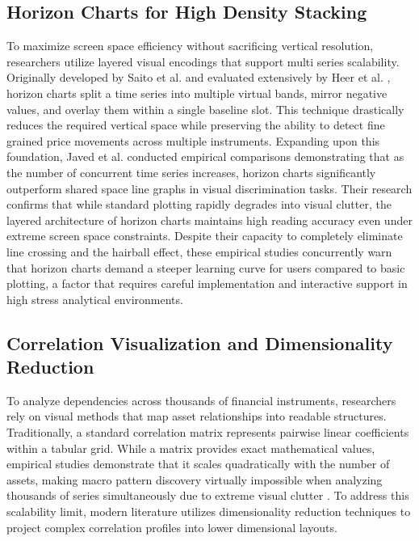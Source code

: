 \documentclass[final,3p,times,twocolumn]{elsarticle}
\begin{document}
\subsection{Horizon Charts for High Density Stacking}\label{sec_horizon}
To maximize screen space efficiency without sacrificing vertical resolution, researchers utilize layered visual encodings that support multi series scalability. Originally developed by Saito et al. \cite{saito2005two} and evaluated extensively by Heer et al. \cite{heer2009crowdsourcing}, horizon charts split a time series into multiple virtual bands, mirror negative values, and overlay them within a single baseline slot. This technique drastically reduces the required vertical space while preserving the ability to detect fine grained price movements across multiple instruments. Expanding upon this foundation, Javed et al. \cite{javed2010graphical} conducted empirical comparisons demonstrating that as the number of concurrent time series increases, horizon charts significantly outperform shared space line graphs in visual discrimination tasks. Their research confirms that while standard plotting rapidly degrades into visual clutter, the layered architecture of horizon charts maintains high reading accuracy even under extreme screen space constraints. Despite their capacity to completely eliminate line crossing and the hairball effect, these empirical studies concurrently warn that horizon charts demand a steeper learning curve for users compared to basic plotting, a factor that requires careful implementation and interactive support in high stress analytical environments.

\subsection{Correlation Visualization and Dimensionality Reduction}\label{sec_correlation}
To analyze dependencies across thousands of financial instruments, researchers rely on visual methods that map asset relationships into readable structures. Traditionally, a standard correlation matrix represents pairwise linear coefficients within a tabular grid. While a matrix provides exact mathematical values, empirical studies demonstrate that it scales quadratically with the number of assets, making macro pattern discovery virtually impossible when analyzing thousands of series simultaneously due to extreme visual clutter \cite{ghoniem2004readability}. To address this scalability limit, modern literature utilizes dimensionality reduction techniques to project complex correlation profiles into lower dimensional layouts. 
\end{document}
